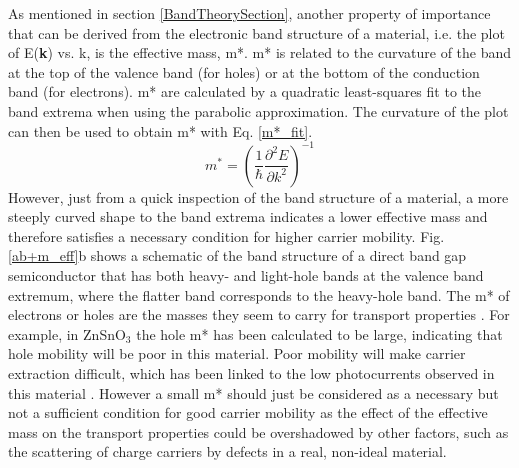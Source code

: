 \documentclass[11pt, twoside]{report}
\begin{document}
As mentioned in section \ref{BandTheorySection}, another property of importance that can be derived from the electronic band structure of a material, i.e. the plot of E(\textbf{k}) vs. k, is the effective mass, m*. m* is related to the curvature of the band at the top of the valence band (for holes) or at the bottom of the conduction band (for electrons). m* are calculated by a quadratic least-squares fit to the band extrema when using the parabolic approximation. The curvature of the plot can then be used to obtain m* with Eq. \ref{m*_fit}.
\begin{equation}\label{m*_fit}
m^* = \left( \frac{1}{\hbar}\frac{\partial^2 E}{\partial k^2} \right)^{-1}
\end{equation}
However, just from a quick inspection of the band structure of a material, a more steeply curved shape to the band extrema indicates a lower effective mass and therefore satisfies a necessary condition for higher carrier mobility. Fig. \ref{ab+m_eff}b shows a schematic of the band structure of a direct band gap semiconductor that has both heavy- and light-hole bands at the valence band extremum, where the flatter band corresponds to the heavy-hole band.
The m* of electrons or holes are the masses they seem to carry for transport properties \cite{dielectric_const1}. For example, in ZnSnO$_3$ the hole m* has been calculated to be large, indicating that hole mobility will be poor in this material. Poor mobility will make carrier extraction difficult, which has been linked to the low photocurrents observed in this material \cite{effective_mass1}.
However a small m* should just be considered as a necessary but not a sufficient condition for good carrier mobility as the effect of the effective mass on the transport properties could be overshadowed by other factors, such as the scattering of charge carriers by defects in a real, non-ideal material. 
\end{document}
